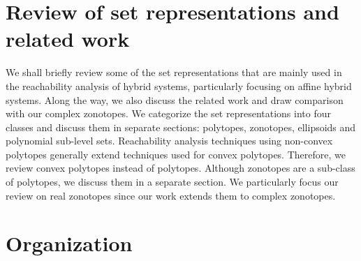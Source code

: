 



\section{Review of set representations and related work}
We shall briefly review some of the set representations that are
mainly used in the reachability analysis of hybrid systems,
particularly focusing on affine hybrid systems.  Along the way, we
also discuss the related work and draw comparison with our complex
zonotopes.  We categorize the set representations into four classes
and discuss them in separate sections: polytopes, zonotopes,
ellipsoids and polynomial sub-level sets.  Reachability analysis
techniques using non-convex polytopes generally extend techniques used
for convex polytopes.  Therefore, we review convex polytopes instead
of polytopes.  Although zonotopes are a sub-class of polytopes, we
discuss them in a separate section.  We particularly focus our review
on real zonotopes since our work extends them to complex zonotopes.
%


\section{Organization}


